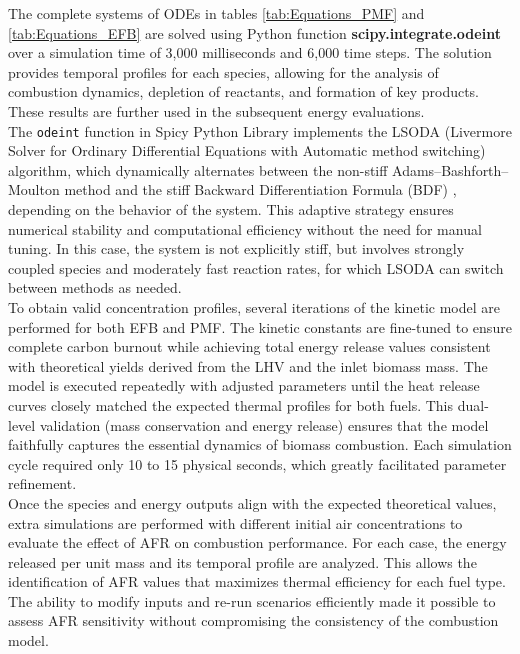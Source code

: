 \documentclass[preprint,12pt]{elsarticle}
\begin{document}
The complete systems of ODEs in tables \ref{tab:Equations_PMF} and \ref{tab:Equations_EFB} are solved using Python function \textbf{scipy.\-integrate.\-odeint}
 over a simulation time of 3,000 milliseconds and 6,000 time steps. The solution provides temporal profiles for each species, allowing for the analysis of combustion dynamics, depletion of reactants, and formation of key products. These results are further used in the subsequent energy evaluations.\\

The \texttt{odeint} function in Spicy Python Library implements the LSODA (Livermore Solver for Ordinary Differential Equations with Automatic method switching) algorithm, which dynamically alternates between the non-stiff Adams--Bashforth--Moulton method and the stiff Backward Differentiation Formula (BDF) \cite{HindmarshODEPACK}, depending on the behavior of the system. This adaptive strategy ensures numerical stability and computational efficiency without the need for manual tuning. In this case, the system is not explicitly stiff, but involves strongly coupled species and moderately fast reaction rates, for which LSODA can switch between methods as needed.\\

To obtain valid concentration profiles, several iterations of the kinetic model are performed for both EFB and PMF. The kinetic constants are fine-tuned to ensure complete carbon burnout while achieving total energy release values consistent with theoretical yields derived from the LHV and the inlet biomass mass. The model is executed repeatedly with adjusted parameters until the heat release curves closely matched the expected thermal profiles for both fuels. This dual-level validation (mass conservation and energy release) ensures that the model faithfully captures the essential dynamics of biomass combustion. Each simulation cycle required only 10 to 15 physical seconds, which greatly facilitated parameter refinement.\\

Once the species and energy outputs align with the expected theoretical values, extra simulations are performed with different initial air concentrations to evaluate the effect of AFR on combustion performance. For each case, the energy released per unit mass and its temporal profile are analyzed. This allows the identification of AFR values that maximizes thermal efficiency for each fuel type. The ability to modify inputs and re-run scenarios efficiently made it possible to assess AFR sensitivity without compromising the consistency of the combustion model.\\
\end{document}
